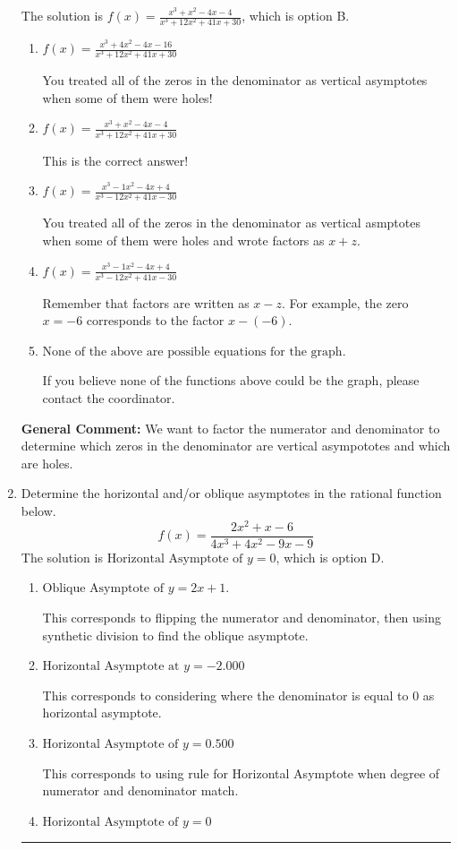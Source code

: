 \documentclass{extbook}[14pt]
\newcommand{\litem}[1]{\item #1

\rule{\textwidth}{0.4pt}}
\begin{document}
\begin{enumerate}
{The solution is \( f(x)=\frac{x^{3} + x^{2} -4 x -4}{x^{3} +12 x^{2} +41 x + 30} \), which is option B.\begin{enumerate}[label=\Alph*.]
\item \( f(x)=\frac{x^{3} +4 x^{2} -4 x -16}{x^{3} +12 x^{2} +41 x + 30} \)

You treated all of the zeros in the denominator as vertical asymptotes when some of them were holes!
\item \( f(x)=\frac{x^{3} + x^{2} -4 x -4}{x^{3} +12 x^{2} +41 x + 30} \)

This is the correct answer!
\item \( f(x)=\frac{x^{3} -1 x^{2} -4 x + 4}{x^{3} -12 x^{2} +41 x -30} \)

You treated all of the zeros in the denominator as vertical asmptotes when some of them were holes and wrote factors as $x+z$.
\item \( f(x)=\frac{x^{3} -1 x^{2} -4 x + 4}{x^{3} -12 x^{2} +41 x -30} \)

Remember that factors are written as $x-z$. For example, the zero $x=-6$ corresponds to the factor $x-(-6)$.
\item \( \text{None of the above are possible equations for the graph.} \)

If you believe none of the functions above could be the graph, please contact the coordinator.
\end{enumerate}

\textbf{General Comment:} We want to factor the numerator and denominator to determine which zeros in the denominator are vertical asympototes and which are holes.
}
\litem{
Determine the horizontal and/or oblique asymptotes in the rational function below.
\[ f(x) = \frac{2x^{2} +x -6}{4x^{3} +4 x^{2} -9 x -9} \]The solution is \( \text{Horizontal Asymptote of } y = 0 \), which is option D.\begin{enumerate}[label=\Alph*.]
\item \( \text{Oblique Asymptote of } y = 2x + 1. \)

This corresponds to flipping the numerator and denominator, then using synthetic division to find the oblique asymptote.
\item \( \text{Horizontal Asymptote at } y = -2.000 \)

This corresponds to considering where the denominator is equal to 0 as horizontal asymptote.
\item \( \text{Horizontal Asymptote of } y = 0.500  \)

This corresponds to using rule for Horizontal Asymptote when degree of numerator and denominator match.
\item \( \text{Horizontal Asymptote of } y = 0 \)


\end{enumerate}}
\end{enumerate}
\end{document}
